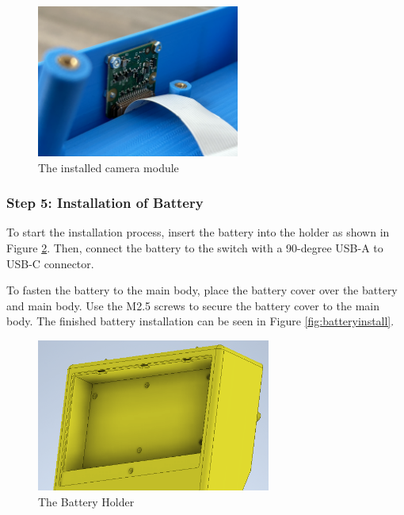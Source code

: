 \begin{figure}
    \centering
    \includegraphics[height=5cm]{texs/Part1/chapter5/image/caminstall.jpg}
    \caption{The installed camera module}
    \label{fig:camerainstall}
\end{figure}

\subsubsection{Step 5: Installation of Battery}
To start the installation process, insert the battery into the holder as shown in Figure \ref{fig:batteryholder}. Then, connect the battery to the switch with a 90-degree USB-A to USB-C connector.

To fasten the battery to the main body, place the battery cover over the battery and main body. Use the M2.5 screws to secure the battery cover to the main body. The finished battery installation can be seen in Figure \ref{fig:batteryinstall}.

\begin{figure}
    \centering
    \includegraphics[height=5cm]{texs/Part1/chapter5/image/battslot.png}
    \caption{The Battery Holder}
    \label{fig:batteryholder}
\end{figure}

